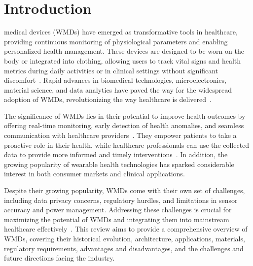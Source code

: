 \documentclass[journal]{IEEEtran}
\begin{document}
\section{Introduction}
% 
% 
% 
% 
 medical devices (WMDs) have emerged as transformative tools in healthcare, providing continuous monitoring of physiological parameters and enabling personalized health management. These devices are designed to be worn on the body or integrated into clothing, allowing users to track vital signs and health metrics during daily activities or in clinical settings without significant discomfort~\cite{Fotiadis2006}. Rapid advances in biomedical technologies, microelectronics, material science, and data analytics have paved the way for the widespread adoption of WMDs, revolutionizing the way healthcare is delivered~\cite{Dias2018}.

The significance of WMDs lies in their potential to improve health outcomes by offering real-time monitoring, early detection of health anomalies, and seamless communication with healthcare providers~\cite{Fotiadis2006}. They empower patients to take a proactive role in their health, while healthcare professionals can use the collected data to provide more informed and timely interventions~\cite{Degerli2020}. In addition, the growing popularity of wearable health technologies has sparked considerable interest in both consumer markets and clinical applications.

Despite their growing popularity, WMDs come with their own set of challenges, including data privacy concerns, regulatory hurdles, and limitations in sensor accuracy and power management. Addressing these challenges is crucial for maximizing the potential of WMDs and integrating them into mainstream healthcare effectively~\cite{Dias2018, Hemapriya2017}. This review aims to provide a comprehensive overview of WMDs, covering their historical evolution, architecture, applications, materials, regulatory requirements, advantages and disadvantages, and the challenges and future directions facing the industry.
\end{document}
